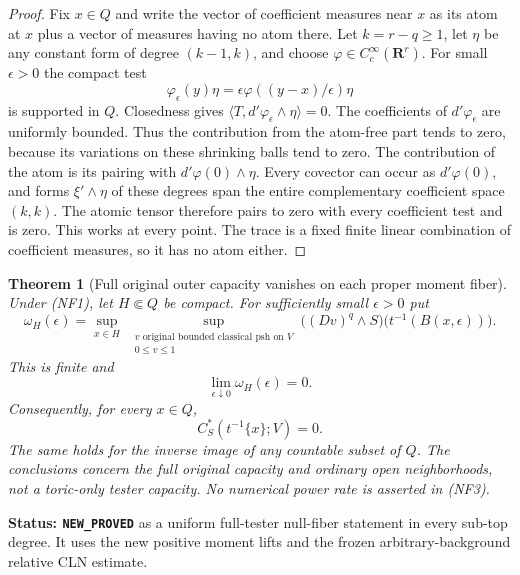 \documentclass[11pt,a4paper]{article}
\numberwithin{equation}{section}
\newtheorem{theorem}{Theorem}[section]
\theoremstyle{definition}
\theoremstyle{remark}
\begin{document}
\begin{proof}
Fix $x\in Q$ and write the vector of coefficient measures near
$x$ as its atom at $x$ plus a vector of measures having no atom
there. Let $k=r-q\geq1$, let $\eta$ be any constant form of
degree $(k-1,k)$, and choose $\varphi\in C_c^\infty(\mathbf R^r)$.
For small $\epsilon>0$ the compact test
\[
               \varphi_\epsilon(y)\eta
           =\epsilon\varphi((y-x)/\epsilon)\eta
\]
is supported in $Q$. Closedness gives
$\langle T,d'\varphi_\epsilon\wedge\eta\rangle=0$.
The coefficients of $d'\varphi_\epsilon$ are uniformly bounded.
Thus the contribution from the atom-free part tends to zero,
because its variations on these shrinking balls tend to zero.
The contribution of the atom is its pairing with
$d'\varphi(0)\wedge\eta$. Every covector can occur as
$d'\varphi(0)$, and forms $\xi'\wedge\eta$ of these degrees
span the entire complementary coefficient space $(k,k)$.
The atomic tensor therefore pairs to zero with every coefficient
test and is zero. This works at every point.
The trace is a fixed finite linear combination of coefficient
measures, so it has no atom either.
\end{proof}

\begin{theorem}[Full original outer capacity vanishes on each proper moment fiber]
\label{thm:r12-null-proper-moment-fibers}
Under (NF1), let $H\Subset Q$ be compact. For sufficiently
small $\epsilon>0$ put
\[
 \omega_H(\epsilon)=
   \sup_{x\in H}\ \sup_{\substack{v\text{ original bounded classical psh on }V\\
                                  0\leq v\leq1}}
     \bigl((Dv)^q\wedge S\bigr)
                           \bigl(t^{-1}(B(x,\epsilon))\bigr).
 \tag{NF2}
\]
This is finite and
\[
                  \lim_{\epsilon\downarrow0}\omega_H(\epsilon)=0.
 \tag{NF3}
\]
Consequently, for every $x\in Q$,
\[
                    C_S^*(t^{-1}\{x\};V)=0.
 \tag{NF4}
\]
The same holds for the inverse image of any countable subset
of $Q$. The conclusions concern the full original capacity
and ordinary open neighborhoods, not a toric-only tester capacity.
No numerical power rate is asserted in (NF3).
\end{theorem}

\noindent\textbf{Status: \texttt{NEW\_PROVED}} as a
uniform full-tester null-fiber statement in every sub-top
degree. It uses the new positive moment lifts and the frozen
arbitrary-background relative CLN estimate.
\end{document}
